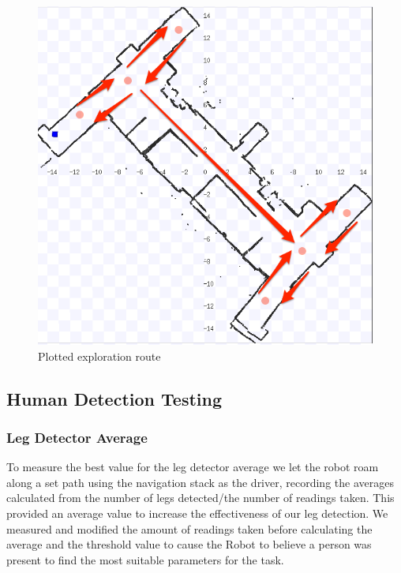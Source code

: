 \documentclass{article}
\begin{document}
          \begin{figure}[H]
	\begin{center}
              \includegraphics[width=0.8\linewidth]{ExperimentalResults10}
              \end{center}
              \caption{Plotted exploration route}
          \end{figure}
	
	\subsection{Human Detection Testing}
	\subsubsection{Leg Detector Average}
	To measure the best value for the leg detector average we let the robot roam along a set path using the navigation stack as the driver, recording the averages calculated from the number of legs detected/the number of readings taken. This provided an average value to increase the effectiveness of our leg detection. We measured and modified the amount of readings taken before calculating the average and the threshold value to cause the Robot to believe a person was present to find the most suitable parameters for the task.
\end{document}
